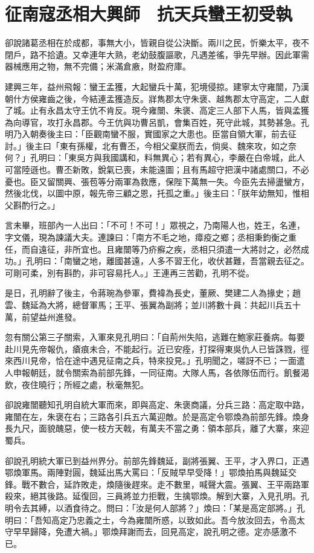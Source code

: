 
\chapter{征南寇丞相大興師　抗天兵蠻王初受執}

卻說諸葛丞相在於成都，事無大小，皆親自從公決斷。兩川之民，忻樂太平，夜不閉戶，路不拾遺。又幸連年大熟，老幼鼓腹謳歌，凡遇差徭，爭先早辦。因此軍需器械應用之物，無不完備；米滿倉廒，財盈府庫。

建興三年，益州飛報：蠻王孟獲，大起蠻兵十萬，犯境侵掠。建寧太守雍闓，乃漢朝什方侯雍齒之後，今結連孟獲造反。牂雋郡太守朱褒、越雋郡太守高定，二人獻了城。止有永昌太守王伉不肯反。現今雍闓、朱褒、高定三人部下人馬，皆與孟獲為向導官，攻打永昌郡。今王伉與功曹呂凱，會集百姓，死守此城，其勢甚急。孔明乃入朝奏後主曰：「臣觀南蠻不服，實國家之大患也。臣當自領大軍，前去征討。」後主曰「東有孫權，北有曹丕，今相父棄朕而去，倘吳、魏來攻，如之奈何？」孔明曰：「東吳方與我國講和，料無異心；若有異心，李嚴在白帝城，此人可當陸遜也。曹丕新敗，銳氣已喪，未能遠圖；且有馬超守把漢中諸處關口，不必憂也。臣又留關興、張苞等分兩軍為救應，保陛下萬無一失。今臣先去掃盪蠻方，然後北伐，以圖中原，報先帝三顧之恩，托孤之重。」後主曰：「朕年幼無知，惟相父斟酌行之。」

言未畢，班部內一人出曰：「不可！不可！」眾視之，乃南陽人也，姓王，名連，字文儀，現為諫議大夫。連諫曰：「南方不毛之地，瘴疫之鄉；丞相秉鈞衡之重任，而自遠征，非所宜也。且雍闓等乃疥癬之疾，丞相只須遣一大將討之，必然成功。」孔明曰：「南蠻之地，離國甚遠，人多不習王化，收伏甚難，吾當親去征之。可剛可柔，別有斟酌，非可容易托人。」王連再三苦勸，孔明不從。

是日，孔明辭了後主，令蔣琬為參軍，費褘為長史，董厥、樊建二人為掾史；趙雲、魏延為大將，總督軍馬；王平、張翼為副將；並川將數十員：共起川兵五十萬，前望益州進發。

忽有關公第三子關索，入軍來見孔明曰：「自荊州失陷，逃難在鮑家莊養病。每要赴川見先帝報仇，瘡痕未合，不能起行。近已安痊，打探得東吳仇人已皆誅戮，徑來西川見帝，恰在途中遇見征南之兵，特來投見。」孔明聞之，嗟訝不已；一面遣人申報朝廷，就令關索為前部先鋒，一同征南。大隊人馬，各依隊伍而行。飢餐渴飲，夜住曉行；所經之處，秋毫無犯。

卻說雍闓聽知孔明自統大軍而來，即與高定、朱褒商議，分兵三路：高定取中路，雍闓在左，朱褒在右；三路各引兵五六萬迎敵。於是高定令鄂煥為前部先鋒。煥身長九尺，面貌醜惡，使一枝方天戟，有萬夫不當之勇：領本部兵，離了大寨，來迎蜀兵。

卻說孔明統大軍已到益州界分。前部先鋒魏延，副將張翼、王平，才入界口，正遇鄂煥軍馬。兩陣對圓，魏延出馬大罵曰：「反賊早早受降！」鄂煥拍馬與魏延交鋒。戰不數合，延詐敗走，煥隨後趕來。走不數里，喊聲大震。張翼、王平兩路軍殺來，絕其後路。延復回，三員將並力拒戰，生擒鄂煥。解到大寨，入見孔明。孔明令去其縛，以酒食待之。問曰：「汝是何人部將？」煥曰：「某是高定部將。」孔明曰：「吾知高定乃忠義之士，今為雍闓所惑，以致如此。吾今放汝回去，令高太守早早歸降，免遭大禍。」鄂煥拜謝而去，回見高定，說孔明之德。定亦感激不已。

